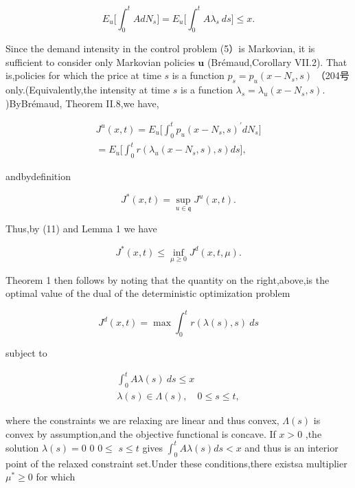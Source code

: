 \[
E _ { u } \Bigg [ \int _ { 0 } ^ { t } A d N _ { s } \Bigg ] = E _ { u } \Bigg [ \int _ { 0 } ^ { t } A \lambda _ { s } ~ d s \Bigg ] \leqslant x .
\]

Since the demand intensity in the control problem (5）is Markovian, it
is sufficient to consider only Markovian policies \(\boldsymbol { u }\)
(Brémaud,Corollary VII.2). That is,policies for which the price at time
\(s\) is a function \(p _ { s } = p _ { u } ( x - N _ { s } , s )\)
（204号 only.(Equivalently,the intensity at time \(s\) is a function
\(\lambda _ { s } = \lambda _ { u } ( x - N _ { s } , s ) .\)
)ByBrémaud, Theorem II.8,we have,

\[
\begin{array} { c } { { J ^ { u } ( x , t ) = E _ { u } \Bigg [ \displaystyle \int _ { 0 } ^ { t } p _ { u } ( x - N _ { s } , s ) ^ { \prime } d N _ { s } \Bigg ] } } \\ { { = E _ { u } \Bigg [ \displaystyle \int _ { 0 } ^ { t } r ( \lambda _ { u } ( x - N _ { s } , s ) , s ) d s \Bigg ] , } } \end{array}
\]

andbydefinition

\[
J ^ { * } ( x , t ) = \operatorname* { s u p } _ { u \in \mathfrak { q } } J ^ { u } ( x , t ) .
\]

Thus,by (11) and Lemma 1 we have

\[
J ^ { * } ( x , t ) \leqslant \underset { \mu \geqslant 0 } { \operatorname* { i n f } } J ^ { d } ( x , t , \mu ) .
\]

Theorem 1 then follows by noting that the quantity on the right,above,is
the optimal value of the dual of the deterministic optimization problem

\[
J ^ { d } ( x , t ) = \operatorname* { m a x } \int _ { 0 } ^ { t } r ( \lambda ( s ) , s ) \ d s
\]

subject to

\[
\begin{array} { l } { \displaystyle \int _ { 0 } ^ { t } { A \lambda ( s ) ~ d s } \leqslant x } \\ { \displaystyle \lambda ( s ) \in \Lambda ( s ) , \quad 0 \leqslant s \leqslant t , } \end{array}
\]

where the constraints we are relaxing are linear and thus convex,
\(\Lambda ( s )\) is convex by assumption,and the objective functional
is concave. If \(x > 0\) ,the solution \(\lambda ( s ) = 0\) 0
\(0 \leqslant\) \(s \leqslant t\) gives
\(\textstyle \int _ { 0 } ^ { t } A \lambda ( s ) d s < x\) and thus is
an interior point of the relaxed constraint set.Under these
conditions,there existsa multiplier \(\mu ^ { * } \geqslant 0\) for
which

